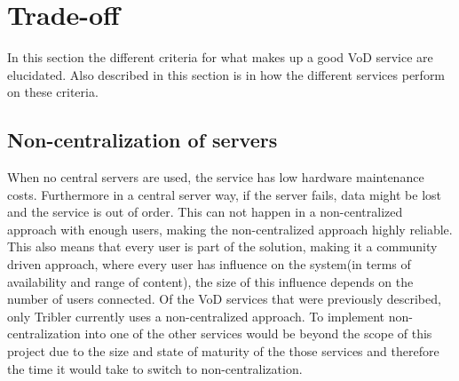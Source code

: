 \section{Trade-off}
In this section the different criteria for what makes up a good VoD service are elucidated. Also described in this section is in how the different services perform on these criteria.

\subsection{Non-centralization of servers}
\label{sec:central}
When no central servers are used, the service has low hardware maintenance costs. Furthermore in a central server way, if the server fails, data might be lost and the service is out of order. This can not happen in a non-centralized approach with enough users, making the non-centralized approach highly reliable. This also means that every user is part of the solution, making it a community driven approach, where every user has influence on the system(in terms of availability and range of content), the size of this influence depends on the number of users connected.
Of the VoD services that were previously described, only Tribler currently uses a non-centralized approach. To implement non-centralization into one of the other services would be beyond the scope of this project due to the size and state of maturity of the those services and therefore the time it would take to switch to non-centralization. 

